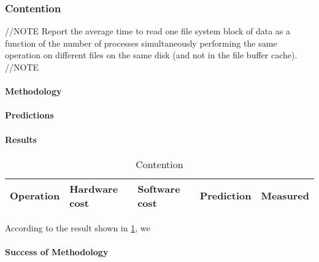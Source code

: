 \subsubsection{Contention}
//NOTE
Report the average time to read one file system block of data as a function of the number of processes simultaneously performing the same operation on different files on the same disk (and not in the file buffer cache).
//NOTE

\paragraph{Methodology}

\paragraph{Predictions}
\paragraph{Results}
\begin{table}
\begin{center}
\begin{tabular}{| l | l | l | l | l |}
\hline
Operation & Hardware cost & Software cost & Prediction & Measured \\
\hline
\end{tabular}
\end{center}
\caption{Contention\label{tab:contention}}
\end{table}

According to the result shown in \ref{tab:contention}, we

\paragraph{Success of Methodology}
